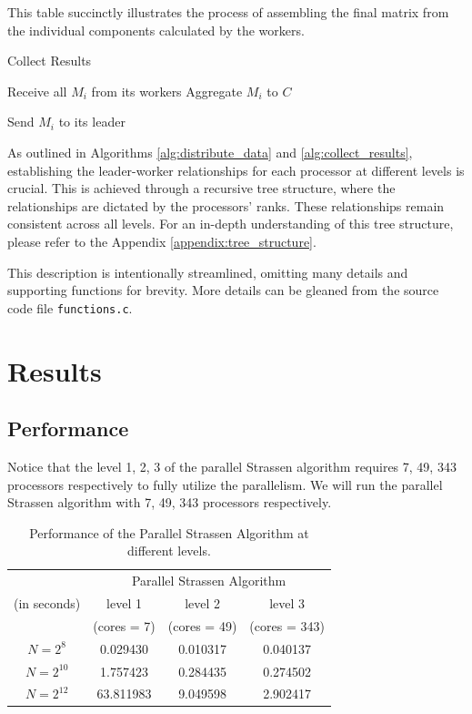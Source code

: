 \documentclass[12pt,a4paper]{article}
\begin{document}
This table succinctly illustrates the process of assembling the final matrix from the individual components calculated by the workers.

\begin{algorithm}[htbp]
    \caption{Collect Results}
    \label{alg:collect_results}
    \begin{algorithmic}[1]
            \State Receive all $M_i$ from its workers
            \State Aggregate $M_i$ to $C$
        \EndIf
        
            \State Send $M_i$ to its leader
       \EndIf
    \EndProcedure
    \end{algorithmic}
\end{algorithm}   


As outlined in Algorithms \ref{alg:distribute_data} and \ref{alg:collect_results}, establishing the leader-worker relationships for each processor at different levels is crucial. 
This is achieved through a recursive tree structure, where the relationships are dictated by the processors' ranks. 
These relationships remain consistent across all levels. 
For an in-depth understanding of this tree structure, please refer to the Appendix \ref{appendix:tree_structure}.

This description is intentionally streamlined, 
omitting many details and supporting functions for brevity. 
More details can be gleaned from the source code file \texttt{functions.c}.

\section{Results}
\subsection{Performance}
Notice that the level 1, 2, 3 of the parallel Strassen algorithm requires 7, 49, 343 processors respectively to 
fully utilize the parallelism. We will run the parallel Strassen algorithm with 7, 49, 343 processors respectively.
\begin{table}[ht]
    \centering
    \begin{tabular}{cccc}
        \toprule
        & \multicolumn{3}{c}{Parallel Strassen Algorithm} \\
        \cmidrule(lr){2-4}
        (in seconds) &  level 1  &  level 2  &  level 3 \\
        & (cores = 7) & (cores = 49) & (cores = 343) \\
        \midrule
        \( N = 2^8 \)  & 0.029430 & 0.010317 & 0.040137 \\
        \( N = 2^{10} \) & 1.757423 & 0.284435 & 0.274502 \\
        \( N = 2^{12} \) & 63.811983 & 9.049598 & 2.902417 \\
        \bottomrule
    \end{tabular}
    \caption{Performance of the Parallel Strassen Algorithm at different levels.}
    \label{tab:results}
\end{table}
\end{document}
